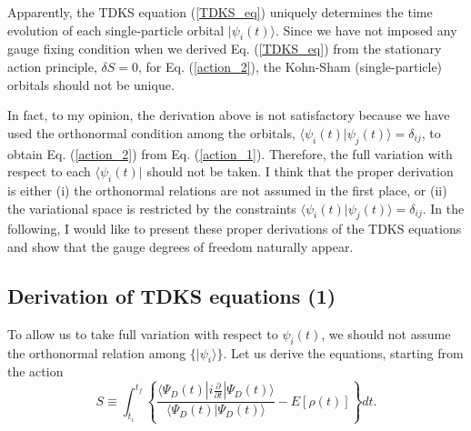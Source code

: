 \documentclass[twoside]{article}
\newcommand{\bra}[1]{\langle {#1} |}
\newcommand{\ket}[1]{| {#1} \rangle}
\newcommand{\inproduct}[2]{\langle #1 | #2 \rangle}
\begin{document}
{Apparently, the TDKS equation (\ref{TDKS_eq}) uniquely determines
the time evolution of each single-particle orbital $\ket{\psi_i(t)}$.
Since we have not imposed any gauge fixing
condition when we derived Eq. (\ref{TDKS_eq})
from the stationary action principle, $\delta S=0$,
for Eq. (\ref{action_2}),
the Kohn-Sham (single-particle) orbitals should not be unique.

In fact, to my opinion,
the derivation above is not satisfactory because we have used the
orthonormal condition among the orbitals,
$\inproduct{\psi_i(t)}{\psi_j(t)}=\delta_{ij}$,
to obtain Eq. (\ref{action_2}) from Eq. (\ref{action_1}).
Therefore, the full variation with respect to
each $\bra{\psi_i(t)}$ should not be taken.
I think that the proper derivation is either
(i) the orthonormal relations are not assumed in the first place,
or (ii) the variational space is restricted by the constraints
$\inproduct{\psi_i(t)}{\psi_j(t)}=\delta_{ij}$.
In the following,
I would like to present these proper derivations of the TDKS equations
and show that the gauge degrees of freedom naturally appear.

\subsection{Derivation of TDKS equations (1)}

To allow us to take full variation with respect to $\psi_i(t)$,
we should not assume the orthonormal relation among $\{ \ket{\psi_i} \}$.
Let us derive the equations,
starting from the action 
\begin{equation}
\label{action_3}
S \equiv \int_{t_i}^{t_f} \left\{
\frac{
\bra{\Psi_D(t)} i\frac{\partial}{\partial t} \ket{\Psi_D(t)}}
{\inproduct{\Psi_D(t)}{\Psi_D(t)}}
- E[\rho(t)] 
\right\} dt .
\end{equation}

}
\end{document}
